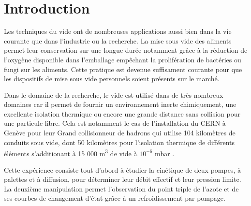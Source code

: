\section{Introduction}

Les techniques du vide ont de nombreuses applications aussi bien dans la vie courante que dans l'industrie ou la recherche. La mise sous vide des aliments permet leur conservation sur une longue durée notamment grâce à la réduction de l'oxygène disponible dans l'emballage empêchant la prolifération de bactéries ou fungi sur les aliments. Cette pratique est devenue suffisament courante pour que les dispositifs de mise sous vide personnels soient présents sur le marché.

Dans le domaine de la recherche, le vide est utilisé dans de très nombreux domaines car il permet de fournir un environnement inerte chimiquement, une excellente isolation thermique ou encore une grande distance sans collision pour une particule libre. Cela est notamment le cas de l'installation du CERN à Genève pour leur Grand collisionneur de hadrons qui utilise 104 kilomètres de conduits sous vide, dont 50 kilomètres pour l'isolation thermique de différents éléments s'additionant à 15 000 \si{\cubic \meter} de vide à \(10^{-6}\) \si{\milli \bar} \cite{CERN}.

Cette expérience consiste tout d'abord à étudier la cinétique de deux pompes, à palettes et à diffusion, pour déterminer leur débit effectif et leur pression limite. La deuxième manipulation permet l'observation du point triple de l'azote et de ses courbes de changement d'état grâce à un refroidissement par pompage.

